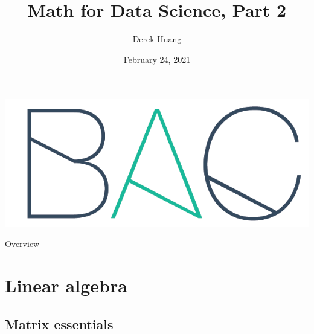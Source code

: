 \documentclass{beamer}
\title[Math for Data Science, Part 2]{Math for Data Science, Part 2}
\author[Derek Huang (BAC Advanced Team)]{Derek Huang}
\institute{BAC Advanced Team}
\date{February 24, 2021}
\numberwithin{equation}{section}
\begin{document}
\begin{frame}
    \titlepage
    \centering
    \includegraphics[scale = 0.1]{../bac_logo1.png}
\end{frame}

\begin{frame}{Overview}
    \tableofcontents
\end{frame}

\section{Linear algebra}

\subsection{Matrix essentials}
\end{document}

